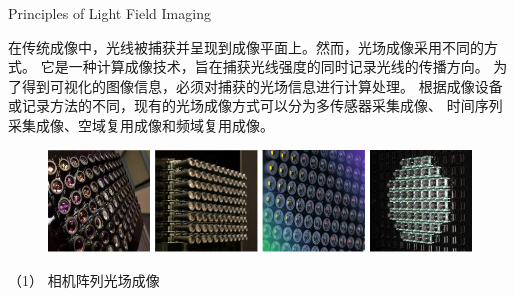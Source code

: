 

{Principles of Light Field Imaging}

在传统成像中，光线被捕获并呈现到成像平面上。然而，光场成像采用不同的方式。
它是一种计算成像技术，旨在捕获光线强度的同时记录光线的传播方向。
为了得到可视化的图像信息，必须对捕获的光场信息进行计算处理。
根据成像设备或记录方法的不同，现有的光场成像方式可以分为多传感器采集成像、
时间序列采集成像、空域复用成像和频域复用成像。









\begin{figure}[b]
	\centering
	\includegraphics[width=1\linewidth]{figures/chapter2/camera_array}
	\label{chapter2_fig2:camera_array}
\end{figure}






（1）
相机阵列光场成像


%
%
%



